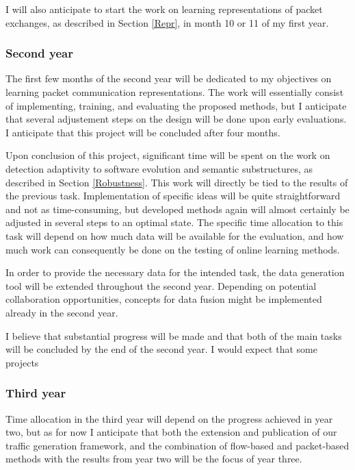 \documentclass[a4paper,12pt,twoside]{report}
\begin{document}
I will also anticipate to start the work on learning representations of packet exchanges, as described in Section \ref{Repr}, in month 10 or 11 of my first year.

\subsubsection{Second year}

The first few months of the second year will be dedicated to my objectives on learning packet communication representations. The work will essentially consist of
implementing, training, and evaluating the proposed methods, but I anticipate that several adjustement steps on the design will be done upon early evaluations. I anticipate that this project will be concluded after four months.

Upon conclusion of this project, significant time will be spent on the work on detection adaptivity to software evolution and semantic substructures, as described in Section \ref{Robustness}. This work will directly be tied to the results of the previous task. Implementation of specific ideas will be quite straightforward and not as time-consuming, but developed methods again will almost certainly be adjusted in several steps to an optimal state. The specific time allocation to this task will depend on how much data will be available for the evaluation, and how much work can consequently be done on the testing of online learning methods. 

In order to provide the necessary data for the intended task, the data generation tool will be extended throughout the second year. Depending on potential collaboration opportunities, concepts for data fusion might be implemented already in the second year.

I believe that substantial progress will be made and that both of the main tasks will be concluded by the end of the second year. I would expect that some projects 

\subsubsection{Third year}

Time allocation in the third year will depend on the progress achieved in year two, but as for now I anticipate that both the extension and publication of our traffic generation framework, and the combination of flow-based and packet-based methods with the results from year two will be the focus of year three. 
\end{document}
